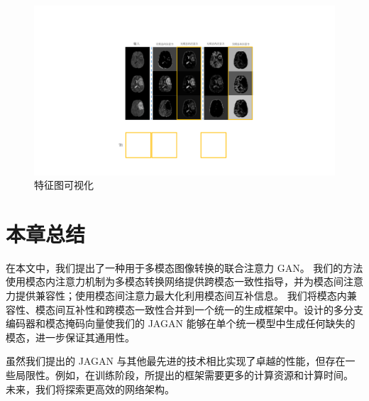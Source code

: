 \begin{figure}
	\begin{center}
		\includegraphics[width=0.8\columnwidth]{figures/JAGAN/ablation1.pdf}
	\end{center}
	\caption{特征图可视化}
	\label{fig:ablation1}
\end{figure}




\section{本章总结}

在本文中，我们提出了一种用于多模态图像转换的联合注意力 GAN。 我们的方法使用模态内注意力机制为多模态转换网络提供跨模态一致性指导，并为模态间注意力提供兼容性；使用模态间注意力最大化利用模态间互补信息。 我们将模态内兼容性、模态间互补性和跨模态一致性合并到一个统一的生成框架中。设计的多分支编码器和模态掩码向量使我们的 JAGAN 能够在单个统一模型中生成任何缺失的模态，进一步保证其通用性。

虽然我们提出的 JAGAN 与其他最先进的技术相比实现了卓越的性能，但存在一些局限性。例如，在训练阶段，所提出的框架需要更多的计算资源和计算时间。 未来，我们将探索更高效的网络架构。
